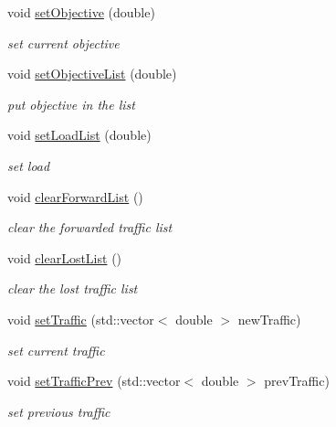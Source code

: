 \begin{DoxyCompactItemize}
void \hyperlink{classstatistics_ab2fd434123379e7814c21bc38ff2bb20}{setObjective} (double)
\begin{DoxyCompactList}\small\item\em set current objective \item\end{DoxyCompactList}\item 
void \hyperlink{classstatistics_a625258dee0b4eaf0fa5ade3643a4535e}{setObjectiveList} (double)
\begin{DoxyCompactList}\small\item\em put objective in the list \item\end{DoxyCompactList}\item 
void \hyperlink{classstatistics_af1594f7585e2c0776ef2f8fb7ddd3fca}{setLoadList} (double)
\begin{DoxyCompactList}\small\item\em set load \item\end{DoxyCompactList}\item 
void \hyperlink{classstatistics_aa371004886cf08d7632027c575d983fc}{clearForwardList} ()
\begin{DoxyCompactList}\small\item\em clear the forwarded traffic list \item\end{DoxyCompactList}\item 
void \hyperlink{classstatistics_a897546605e8b6c2b2ec411092e89dab8}{clearLostList} ()
\begin{DoxyCompactList}\small\item\em clear the lost traffic list \item\end{DoxyCompactList}\item 
void \hyperlink{classstatistics_a3eca72da112aae2a944b7dc40a59b787}{setTraffic} (std::vector$<$ double $>$ newTraffic)
\begin{DoxyCompactList}\small\item\em set current traffic \item\end{DoxyCompactList}\item 
void \hyperlink{classstatistics_ae5d56a6dc6878004b42d10369de284de}{setTrafficPrev} (std::vector$<$ double $>$ prevTraffic)
\begin{DoxyCompactList}\small\item\em set previous traffic \item\end{DoxyCompactList}\end{DoxyCompactItemize}


